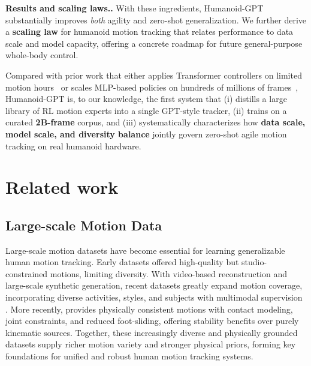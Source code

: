 \documentclass{llmxive}
\providecommand{\paragraph}[1]{\vspace{.5em}\noindent\textbf{#1.}}
\begin{document}
\paragraph{Results and scaling laws.}
With these ingredients, Humanoid-GPT substantially improves \emph{both} agility and zero-shot generalization. We further derive a \textbf{scaling law} for humanoid motion tracking that relates performance to data scale and model capacity, offering a concrete roadmap for future general-purpose whole-body control.

Compared with prior work that either applies Transformer controllers on limited motion hours~\cite{humanplus24} or scales MLP-based policies on hundreds of millions of frames~\cite{sonic25}, Humanoid-GPT is, to our knowledge, the first system that (i) distills a large library of RL motion experts into a single GPT-style tracker, (ii) trains on a curated \textbf{2B-frame} corpus, and (iii) systematically characterizes how \textbf{data scale, model scale, and diversity balance} jointly govern zero-shot agile motion tracking on real humanoid hardware.

\section{Related work}
\label{sec:related_work}

\subsection{Large-scale Motion Data}

Large-scale motion datasets have become essential for learning generalizable human motion tracking. Early datasets \citep{lafan20,amass19,omomo23} offered high-quality but studio-constrained motions, limiting diversity. With video-based reconstruction and large-scale synthetic generation, recent datasets greatly expand motion coverage, incorporating diverse activities, styles, and subjects with multimodal supervision \citep{motionx23, motionx++25,motionmillion25,humanoidx24}.
More recently, \citep{phuma25} provides physically consistent motions with contact modeling, joint constraints, and reduced foot-sliding, offering stability benefits over purely kinematic sources.
Together, these increasingly diverse and physically grounded datasets supply richer motion variety and stronger physical priors, forming key foundations for unified and robust human motion tracking systems.

\end{document}
